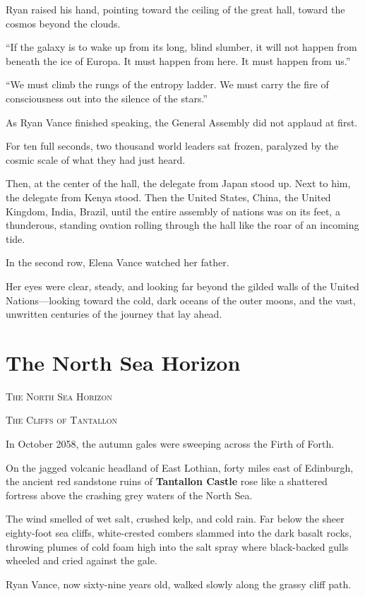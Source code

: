 \documentclass[12pt,twoside,openright]{book}
\newcommand{\sceneheader}[1]{%
  \par\vspace{1.8em}%
  {\noindent\centering\scshape\large #1\par}%
  \vspace{1.0em}%
  \noindent%
}
\begin{document}
Ryan raised his hand, pointing toward the ceiling of the great hall,
toward the cosmos beyond the clouds.

``If the galaxy is to wake up from its long, blind slumber, it will not
happen from beneath the ice of Europa. It must happen from here. It must
happen from us.''

``We must climb the rungs of the entropy ladder. We must carry the fire
of consciousness out into the silence of the stars.''

As Ryan Vance finished speaking, the General Assembly did not applaud at
first.

For ten full seconds, two thousand world leaders sat frozen, paralyzed
by the cosmic scale of what they had just heard.

Then, at the center of the hall, the delegate from Japan stood up. Next
to him, the delegate from Kenya stood. Then the United States, China,
the United Kingdom, India, Brazil, until the entire assembly of nations
was on its feet, a thunderous, standing ovation rolling through the hall
like the roar of an incoming tide.

In the second row, Elena Vance watched her father.

Her eyes were clear, steady, and looking far beyond the gilded walls of
the United Nations---looking toward the cold, dark oceans of the outer
moons, and the vast, unwritten centuries of the journey that lay ahead.

\chapter{The North Sea Horizon}
\sceneheader{The North Sea Horizon}

\sceneheader{The Cliffs of Tantallon}

In October 2058, the autumn gales were sweeping across the Firth of
Forth.

On the jagged volcanic headland of East Lothian, forty miles east of
Edinburgh, the ancient red sandstone ruins of \textbf{Tantallon Castle}
rose like a shattered fortress above the crashing grey waters of the
North Sea.

The wind smelled of wet salt, crushed kelp, and cold rain. Far below the
sheer eighty-foot sea cliffs, white-crested combers slammed into the
dark basalt rocks, throwing plumes of cold foam high into the salt spray
where black-backed gulls wheeled and cried against the gale.

Ryan Vance, now sixty-nine years old, walked slowly along the grassy
cliff path.
\end{document}
